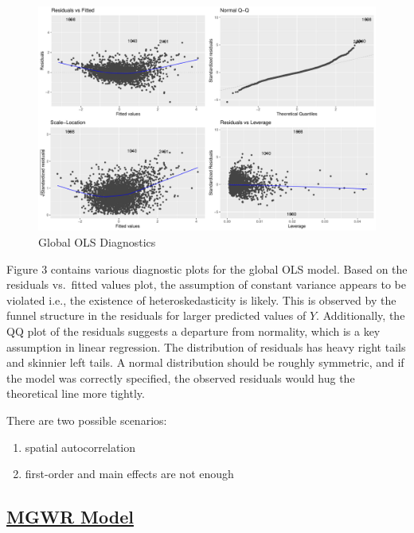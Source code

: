 \documentclass[
]{article}
\begin{document}
\begin{figure}[H]

{\centering \includegraphics{final-project-write-up-nathan-nguyen_files/figure-latex/unnamed-chunk-6-1} 

}

\caption{Global OLS Diagnostics}\label{fig:unnamed-chunk-6}
\end{figure}

Figure 3 contains various diagnostic plots for the global OLS model.
Based on the residuals vs.~fitted values plot, the assumption of
constant variance appears to be violated i.e., the existence of
heteroskedasticity is likely. This is observed by the funnel structure
in the residuals for larger predicted values of \(Y\). Additionally, the
QQ plot of the residuals suggests a departure from normality, which is a
key assumption in linear regression. The distribution of residuals has
heavy right tails and skinnier left tails. A normal distribution should
be roughly symmetric, and if the model was correctly specified, the
observed residuals would hug the theoretical line more tightly.

There are two possible scenarios:

\begin{enumerate}
\def\labelenumi{\arabic{enumi}.}
\item
  spatial autocorrelation
\item
  first-order and main effects are not enough
\end{enumerate}

\newpage

\subsection{\texorpdfstring{\ul{MGWR
Model}}{MGWR Model}}\label{mgwr-model}
\end{document}
